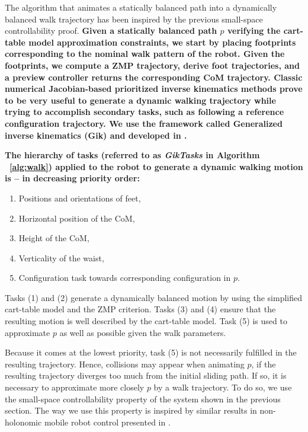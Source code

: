 \documentclass{article}
\begin{document}
The algorithm that animates a statically balanced path into a
dynamically balanced walk trajectory has been inspired by the previous
small-space controllability proof. \textbf{Given a statically balanced
  path $p$ verifying the cart-table model approximation constraints,
  we start by placing footprints corresponding to the nominal walk
  pattern of the robot. Given the footprints, we compute a ZMP
  trajectory, derive foot trajectories, and a preview controller
  returns the corresponding CoM trajectory. Classic numerical
  Jacobian-based prioritized inverse kinematics methods prove to be
  very useful to generate a dynamic walking trajectory while trying to
  accomplish secondary tasks, such as following a reference
  configuration trajectory. We use the framework called Generalized
  inverse kinematics (Gik) and developed in \cite{yoshida2006tds}.}

\textbf{The hierarchy of tasks (referred to as \textit{GikTasks} in
  Algorithm ~\ref{alg:walk}) applied to the robot to generate a
  dynamic walking motion is -- in decreasing priority order:}

\begin{enumerate}

\item Positions and orientations of  feet,

\item Horizontal position of the CoM,

\item Height of the CoM,

\item Verticality of the waist,

\item Configuration task towards corresponding
  configuration  in $p$.

\end{enumerate}

Tasks (1)  and (2) generate a  dynamically balanced motion  by using the
simplified cart-table model  and the ZMP criterion. Tasks  (3) and (4)
ensure that the  resulting motion is well described  by the cart-table
model. Task (5)  is used to approximate $p$ as  well as possible given
the walk parameters.

Because it comes at the  lowest priority, task (5) is not necessarily
fulfilled in  the resulting trajectory. Hence,  collisions may appear
when animating $p$, if the resulting trajectory diverges too much from
the initial sliding  path. If so, it is  necessary to approximate more
closely $p$  by a walk  trajectory.  To do  so, we use  the small-space
controllability  property   of  the  system  shown   in  the  previous
section. The way  we use this property is  inspired by similar results
in non-holonomic mobile robot control presented in \cite{taix-94}.
\end{document}

